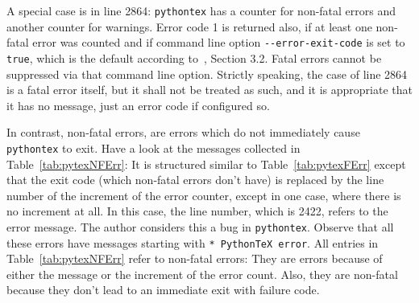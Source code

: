 \documentclass[a4paper, english]{article}%
\begin{document}
A special case is in line 2864: 
\texttt{pythontex} has a counter for non-fatal errors and another counter for warnings. 
Error code 1 is returned also, if at least one non-fatal error was counted 
and if command line option \texttt{-{}-error-exit-code} is set to \texttt{true}, 
which is the default according to~\cite{PythonTexP}, Section 3.2. 
Fatal errors cannot be suppressed via that command line option. 
Strictly speaking, the case of line 2864 is a fatal error itself, 
but it shall not be treated as such, and it is appropriate that it has no message, 
just an error code if configured so. 

In contrast, non-fatal errors, 
are errors which do not immediately cause \texttt{pythontex} to exit. 
Have a look at the messages collected in Table~\ref{tab:pytexNFErr}: 
It is structured similar to Table~\ref{tab:pytexFErr} 
except that the exit code (which non-fatal errors don't have) 
is replaced by the line number of the increment of the error counter, 
except in one case, where there is no increment at all. 
In this case, the line number, which is 2422, refers to the error message. 
The author considers this a bug in \texttt{pythontex}. 
Observe that all these errors have messages starting with \texttt{* PythonTeX error}. 
All entries in Table~\ref{tab:pytexNFErr} refer to non-fatal errors: 
They are errors because of either the message or the increment of the error count. 
Also, they are non-fatal because they don't lead to an immediate exit with failure code. 
\end{document}
